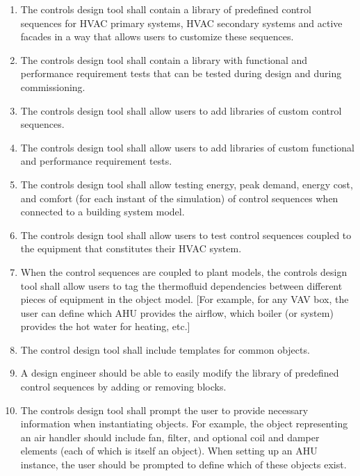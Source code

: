 \documentclass[letterpaper,10pt, openany,english]{sphinxmanual}
\begin{document}
\label{\detokenize{requirements:controls-design-tool}}\begin{enumerate}
\def\theenumi{\arabic{enumi}}
\def\labelenumi{\theenumi .}
\makeatletter\def\p@enumii{\p@enumi \theenumi .}\makeatother
\item {} 
The controls design tool shall contain a library of predefined
control sequences for HVAC primary systems, HVAC secondary systems
and active facades in a way that allows users to customize these
sequences.

\item {} 
The controls design tool shall contain a library with
functional and performance requirement tests
that can be tested during design and during commissioning.

\item {} 
The controls design tool shall allow users to add
libraries of custom control sequences.

\item {} 
The controls design tool shall allow users to add
libraries of custom functional and performance requirement tests.

\item {} 
The controls design tool shall allow testing energy, peak demand,
energy cost, and comfort (for each instant of the simulation)
of control sequences when connected to a building system model.

\item {} 
The controls design tool shall allow users to test control sequences coupled to the equipment that constitutes their HVAC system.

\item {} 
When the control sequences are coupled to plant models, the controls design tool shall allow users to tag the thermofluid dependencies between different pieces of equipment in the object model. {[}For example, for any VAV box, the user can define which AHU provides the airflow, which boiler (or system) provides the hot water for heating, etc.{]}

\item {} 
The control design tool shall include templates for common objects.

\item {} 
A design engineer should be able to easily modify the library of predefined
control sequences by adding or removing blocks.

\item {} 
The controls design tool shall prompt
the user to provide necessary information when instantiating objects.
For example, the object representing an air handler should include fan, filter,
and optional coil and damper elements (each of which is itself an object).
When setting up an AHU instance, the user should be prompted to define
which of these objects exist.


\end{enumerate}
\end{document}
